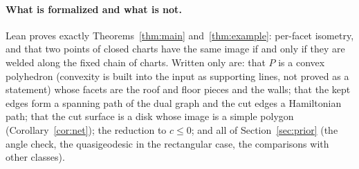 \documentclass[11pt]{article}
\theoremstyle{definition}
\theoremstyle{remark}
\begin{document}
\paragraph{What is formalized and what is not.} Lean proves exactly
Theorems~\ref{thm:main} and~\ref{thm:example}: per-facet isometry, and that
two points of closed charts have the same image if and only if they are
welded along the fixed chain of charts. Written only are: that $P$ is a convex
polyhedron (convexity is built into the input as supporting lines, not proved
as a statement) whose facets are the roof and floor pieces and the walls;
that the kept edges form a spanning path of the dual graph and the cut edges
a Hamiltonian path; that the cut surface is a disk whose image is a simple
polygon (Corollary~\ref{cor:net}); the reduction to $c\le0$; and all of
Section~\ref{sec:prior} (the angle check, the quasigeodesic in the rectangular
case, the comparisons with other classes).
\end{document}
